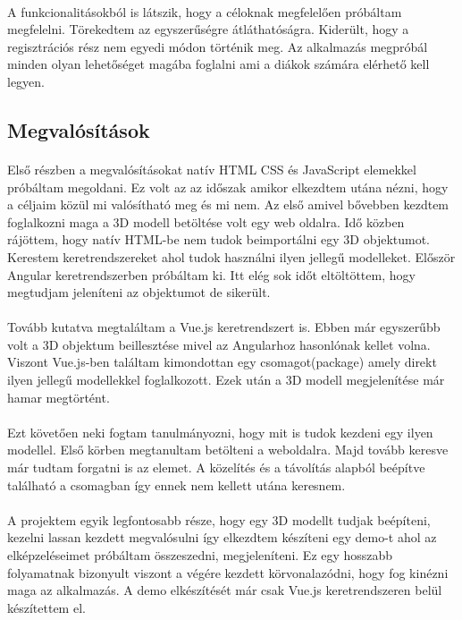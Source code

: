 \documentclass{article}
\begin{document}
	\paragraph{}
	A funkcionalitásokból is látszik, hogy a céloknak megfelelően próbáltam megfelelni. Törekedtem az egyszerűségre átláthatóságra. Kiderült, hogy a regisztrációs rész nem egyedi módon történik meg. Az alkalmazás megpróbál minden olyan lehetőséget magába foglalni ami a diákok számára elérhető kell legyen.
	
	\subsection{Megvalósítások}
	\paragraph{}
	Első részben a megvalósításokat natív HTML CSS és JavaScript elemekkel próbáltam megoldani. Ez volt az az időszak amikor elkezdtem utána nézni, hogy a céljaim közül mi valósítható meg és mi nem. Az első amivel bővebben kezdtem foglalkozni maga a 3D modell betöltése volt egy web oldalra. Idő közben rájöttem, hogy natív HTML-be nem tudok beimportálni egy 3D objektumot. Kerestem keretrendszereket ahol tudok használni ilyen jellegű modelleket. Először Angular keretrendszerben próbáltam ki. Itt elég sok időt eltöltöttem, hogy megtudjam jeleníteni az objektumot de sikerült.
	\paragraph{}
	Tovább kutatva megtaláltam a Vue.js keretrendszert is. Ebben már egyszerűbb volt a 3D objektum beillesztése mivel az Angularhoz hasonlónak kellet volna. Viszont Vue.js-ben találtam kimondottan egy csomagot(package) amely direkt ilyen jellegű modellekkel foglalkozott. Ezek után a 3D modell megjelenítése már hamar megtörtént. 
	\paragraph{}
	Ezt követően neki fogtam tanulmányozni, hogy mit is tudok kezdeni egy ilyen modellel. Első körben megtanultam betölteni a weboldalra. Majd tovább keresve már tudtam forgatni is az elemet. A közelítés és a távolítás alapból beépítve található a csomagban így ennek nem kellett utána keresnem.
	\paragraph{}
	A projektem egyik legfontosabb része, hogy egy 3D modellt tudjak beépíteni, kezelni lassan kezdett megvalósulni így elkezdtem készíteni egy demo-t ahol az elképzeléseimet próbáltam összeszedni, megjeleníteni. Ez egy hosszabb folyamatnak bizonyult viszont a végére kezdett körvonalazódni, hogy fog kinézni maga az alkalmazás. A demo elkészítését már csak Vue.js keretrendszeren belül készítettem el.
\end{document}
